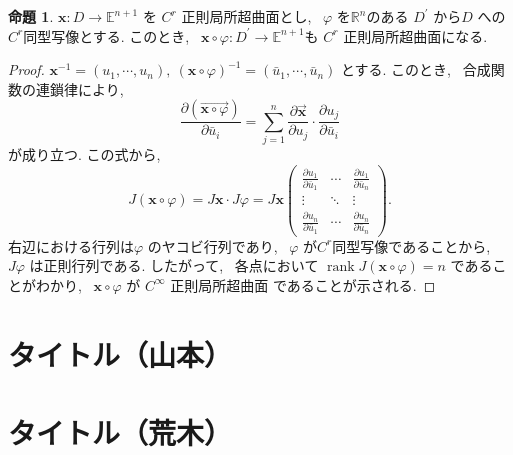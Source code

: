 \documentclass[12pt,a4j,final]{jreport}
\theoremstyle{definition}
\newtheorem{Pro}[Thm]{命題}
\begin{document}
\bigskip

\begin{Pro}\label{Koike1.9.2}
  $\boldsymbol{x}: D \rightarrow \mathbb{E}^{n+1}$ を $C^{r}$ 正則局所超曲面とし, \ $\varphi$ を$\mathbb{R}^n$のある $D^{\prime}$ から$D$ への$C^r$同型写像とする. このとき, \ $\boldsymbol{x} \circ \varphi: D^{\prime} \rightarrow \mathbb{E}^{n+1}$も $C^{r}$ 正則局所超曲面になる.
\end{Pro}


\begin{proof}
  $\boldsymbol{x}^{-1}=\left(u_{1}, \cdots, u_{n}\right), \ (\boldsymbol{x} \circ \varphi)^{-1}=\left(\bar{u}_{1}, \cdots, \bar{u}_{n}\right)$ とする. このとき, \ 合成関数の連鎖律により, \ 
\begin{equation}\label{eq1.9.1}
  \dfrac{\partial(\overrightarrow{\boldsymbol{x} \circ \varphi})}{\partial \bar{u}_{i}}
=\displaystyle \sum_{j=1}^{n} \dfrac{\partial \vec{\boldsymbol{x}}}{\partial u_{j}} \cdot \dfrac{\partial u_{j}}{\partial \bar{u}_{i}}
\end{equation}
 が成り立つ.
この式から, \ 
\begin{equation}
  J(\boldsymbol{x} \circ \varphi)
  =J \boldsymbol{x} \cdot J \varphi
=J \boldsymbol{x} \left(\begin{array}{ccc}\frac{\partial u_{1}}{\partial \bar{u}_{1}} & \cdots & \frac{\partial u_{1}}{\partial \bar{u}_{n}} \\ \vdots & \ddots & \vdots \\ \frac{\partial u_{n}}{\partial \bar{u}_{1}} & \cdots & \frac{\partial u_{n}}{\partial \bar{u}_{n}}\end{array}\right).
\end{equation}
右辺における行列は$\varphi$ のヤコビ行列であり, \ $\varphi$ が$C^r$同型写像であることから, \ $J \varphi$ は正則行列である.
したがって, \ 各点において $\operatorname{rank} J(\boldsymbol{x} \circ \varphi)=n$ であることがわかり, \ $\boldsymbol{x} \circ \varphi$ が $C^{\infty}$ 正則局所超曲面 であることが示される.
\end{proof}




\section{タイトル（山本）}



\section{タイトル（荒木）}
\end{document}
